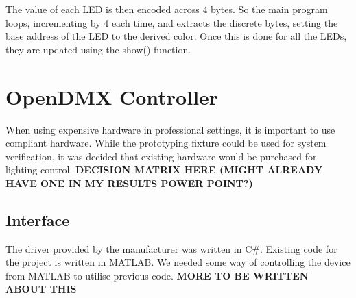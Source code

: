 The value of each LED is then encoded across 4 bytes.
So the main program loops, incrementing by 4 each time,
and extracts the discrete bytes, setting the base address of the LED to the derived color.
Once this is done for all the LEDs, they are updated using the show() function.

\section{OpenDMX Controller}
When using expensive hardware in professional settings, it is important to use compliant hardware.
While the prototyping fixture could be used for system verification,
it was decided that existing hardware would be purchased for lighting control.
\textbf{DECISION MATRIX HERE (MIGHT ALREADY HAVE ONE IN MY RESULTS POWER POINT?)}

\subsection{Interface}
The driver provided by the manufacturer was written in C\#.
Existing code for the project is written in MATLAB.
We needed some way of controlling the device from MATLAB to utilise previous code.
\textbf{MORE TO BE WRITTEN ABOUT THIS}
